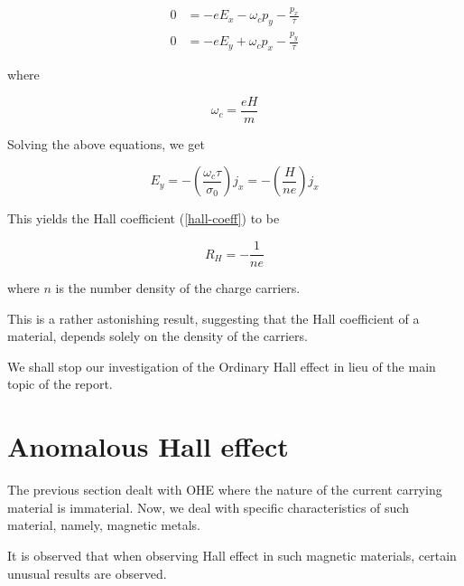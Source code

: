 \begin{equation}
    \begin{split}
        0 &= -e E_x - \omega_c p_y - \frac{p_x}{\tau}\\
        0 &= -e E_y + \omega_c p_x - \frac{p_y}{\tau} 
    \end{split}
\end{equation}

where 

\begin{equation}
    \omega_c = \frac{e H}{m} 
\end{equation}

Solving the above equations, we get

\begin{equation}
    E_y = - \left( \frac{\omega_c \tau}{\sigma_0}  \right) j_x = - \left( \frac{H}{ne} \right) j_x
\end{equation}

This yields the Hall coefficient (\cref{hall-coeff}) to be

\begin{equation}
    R_H = - \frac{1}{ne}
\end{equation}

where $ n $ is the number density of the charge carriers.

This is a rather astonishing result, suggesting that the Hall coefficient of a material, depends solely on the density of the carriers.

We shall stop our investigation of the Ordinary Hall effect in lieu of the main topic of the report.

\section{Anomalous Hall effect}

The previous section dealt with OHE where the nature of the current carrying material is immaterial. Now, we deal with specific characteristics of such material, namely, magnetic metals.

It is observed that when observing Hall effect in such magnetic materials, certain unusual results are observed.
